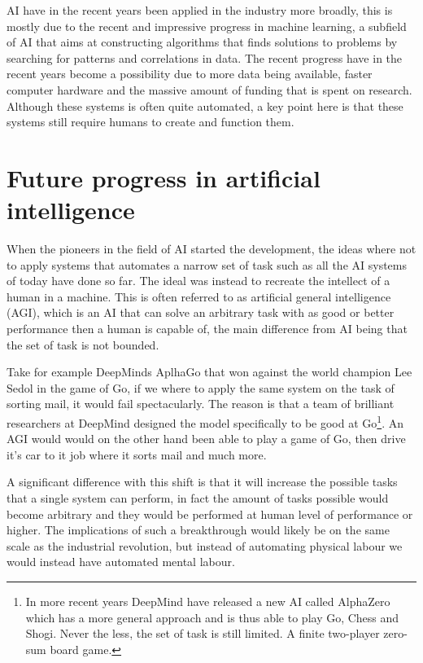 \documentclass[12pt,A4]{report}
\theoremstyle{definition}
\begin{document}
AI have in the recent years been applied in the industry more broadly, this is mostly due to the recent and impressive progress in machine learning, a subfield of AI that aims at constructing algorithms that finds solutions to problems by searching for patterns and correlations in data. The recent progress have in the recent years become a possibility due to more data being available, faster computer hardware and the massive amount of funding that is spent on research. Although these systems is often quite automated, a key point here is that these systems still require humans to create and function them.


\section{Future progress in artificial intelligence}
When the pioneers in the field of AI started the development, the ideas where not to apply systems that automates a narrow set of task such as all the AI systems of today have done so far. The ideal was instead to recreate the intellect of a human in a machine. This is often referred to as artificial general intelligence (AGI), which is an AI that can solve an arbitrary task with as good or better performance then a human is capable of, the main difference from AI being that the set of task is not bounded.

Take for example DeepMinds AplhaGo that won against the world champion Lee Sedol in the game of Go, if we where to apply the same system on the task of sorting mail, it would fail spectacularly. The reason is that a team of brilliant researchers at DeepMind designed the model specifically to be good at Go\footnote{In more recent years DeepMind have released a new AI called AlphaZero which has a more general approach and is thus able to play Go, Chess and Shogi. Never the less, the set of task is still limited. A finite two-player zero-sum board game.}. An AGI would would on the other hand been able to play a game of Go, then drive it's car to it job where it sorts mail and much more. 

A significant difference with this shift is that it will increase the possible tasks that a single system can perform, in fact the amount of tasks possible would become arbitrary and they would be performed at human level of performance or higher. The implications of such a breakthrough would likely be on the same scale as the industrial revolution, but instead of automating physical labour we would instead have automated mental labour. 
\end{document}
